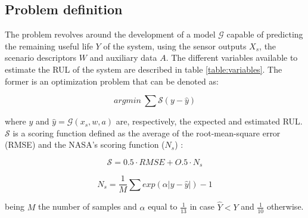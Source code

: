 \documentclass[PHM, 2021]{PHMSociety}
\begin{document}
\subsection{Problem definition}

The problem revolves around the development of a model $\mathcal{G}$ capable of predicting the remaining useful life $Y$ of the system, using the sensor outputs $X_s$, the scenario descriptors $W$ and auxiliary data $A$. The different variables available to estimate the RUL of the system are described in table \ref{table:variables}. The former is an optimization problem that can be denoted as:

\begin{equation}
argmin \: \sum \mathcal{S} \left ( y - \hat{y} \right )
\end{equation}

where $y$ and $\hat{y} = \mathcal{G}(x_s, w, a)$ are, respectively, the expected and estimated RUL. $\mathcal{S}$ is a scoring function defined as the average of the root-mean-square error (RMSE) and the NASA's scoring function ($N_s$) \cite{saxena2008damage}:

\begin{equation}
\mathcal{S} = 0.5 \cdot RMSE + O.5 \cdot N_s
\label{eq:score}
\end{equation}

\begin{equation}
N_s = \frac{1}{M} \sum exp(\alpha | y - \hat{y} |) - 1
\end{equation}

being $M$ the number of samples and $\alpha$ equal to $\frac{1}{13}$ in case $\hat{Y}  < Y$ and $\frac{1}{10}$ otherwise.
\end{document}
